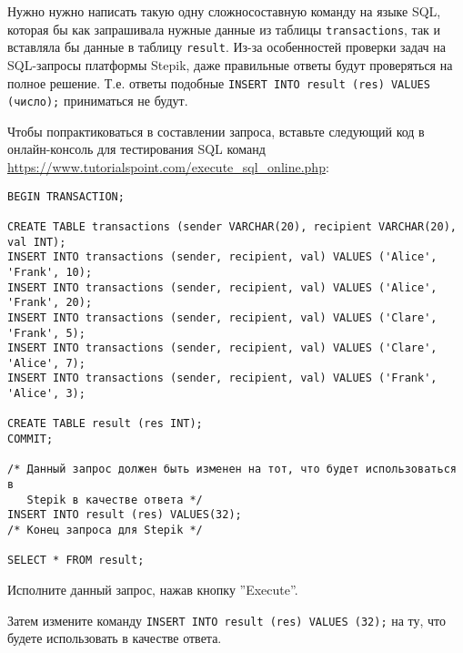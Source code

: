 Нужно нужно написать такую одну сложносоставную команду на языке SQL, которая бы как запрашивала нужные данные из таблицы \texttt{transactions}, так и вставляла бы данные в таблицу \texttt{result}. Из-за особенностей проверки задач на SQL-запросы платформы Stepik, даже правильные ответы будут проверяться на полное решение. Т.е. ответы подобные \texttt{INSERT INTO result (res) VALUES (число);} приниматься не будут. 

\exampleSection


Чтобы попрактиковаться в составлении запроса, вставьте следующий код в онлайн-консоль для тестирования SQL команд \url{https://www.tutorialspoint.com/execute_sql_online.php}:

\begin{verbatim}
BEGIN TRANSACTION;

CREATE TABLE transactions (sender VARCHAR(20), recipient VARCHAR(20), val INT);
INSERT INTO transactions (sender, recipient, val) VALUES ('Alice', 'Frank', 10);
INSERT INTO transactions (sender, recipient, val) VALUES ('Alice', 'Frank', 20);
INSERT INTO transactions (sender, recipient, val) VALUES ('Clare', 'Frank', 5);
INSERT INTO transactions (sender, recipient, val) VALUES ('Clare', 'Alice', 7);
INSERT INTO transactions (sender, recipient, val) VALUES ('Frank', 'Alice', 3);

CREATE TABLE result (res INT);
COMMIT;

/* Данный запрос должен быть изменен на тот, что будет использоваться в 
   Stepik в качестве ответа */
INSERT INTO result (res) VALUES(32);
/* Конец запроса для Stepik */

SELECT * FROM result;
\end{verbatim}

Исполните данный запрос, нажав кнопку ''Execute''.

Затем измените команду \texttt{INSERT INTO result (res) VALUES (32);} на ту, что будете использовать в качестве ответа.

